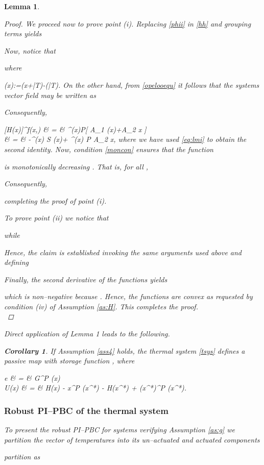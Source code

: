 \documentclass[10pt, conference]{ieeeconf}
\newtheorem{corollary}{Corollary}
\newtheorem{lemma}{Lemma}
\def\begequarrs{}
\def\begequ{}
\def\lab{\label}
\begin{document}
\begin{lemma}
\begin{proof}
We proceed now to prove point (i). Replacing \eqref{phii} in \eqref{hh} and grouping terms yields

Now, notice that

where
\begequ
\lab{phi}
\Phi(x):=\Psi(x+\bar T)-\Psi(\bar T).
\endequ
On the other hand, from \eqref{opelooequ} it follows that the systems vector field may be written as

Consequently,
\begequarrs
[\nabla H(x)]^\top f(x,\theta) & = & \Phi^\top(x)P[ A_1 \Phi(x)+A_2 x ]\\
& = &  -\Phi^\top(x) S  \Phi(x)+ \Phi^\top(x) P A_2 x,
\endequarrs
where we have used \eqref{eq:lmi} to obtain the second identity. Now, condition \eqref{moncon} ensures that the function 

is monotonically decreasing \cite{PAVetal}. That is, for all ,

Consequently,

completing the proof of point (i).

To prove point (ii) we notice that

while

Hence, the claim is established invoking the same arguments used above and defining


Finally, the second derivative of the functions  yields

which is non--negative because . Hence, the functions  are convex as requested by condition (iv) of Assumption \ref{as:H}. This completes the proof.\\
\end{proof}



Direct application of Lemma 1 leads to the following. 
\begin{corollary}
If Assumption \ref{ass4} holds, the thermal system \eqref{tsys} defines a passive map 
with storage function , where 
\begequarrs
e & = & G^\top P \tilde \Phi(x) \\
U(x) & = & H(x) - x^\top P \Phi(x^*) - H(x^*) + (x^*)^\top P \Phi(x^*).
\endequarrs
\end{corollary}
\subsubsection{Robust PI--PBC of the thermal system}
To present the robust PI--PBC for systems verifying Assumption \ref{as:g} we partition the vector of temperatures into its un--actuated and actuated components

partition  as


\end{lemma}
\end{document}
